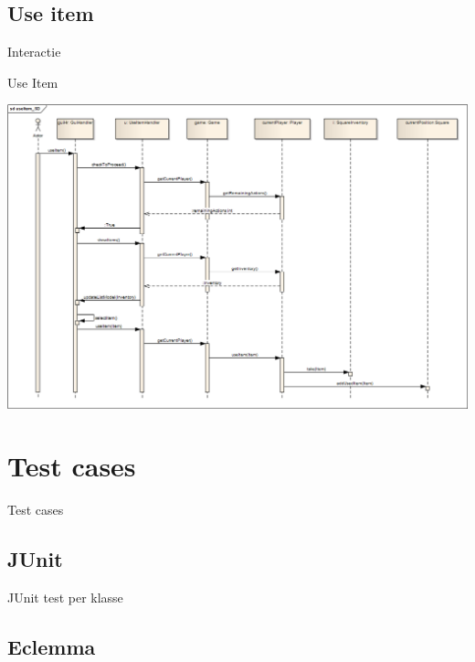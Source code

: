 \documentclass[t]{beamer}
\begin{document}
\subsection{Use item}
\begin{frame}{Interactie}
\begin{multicols}{2}
\tableofcontents[currentsection]
\end{multicols}
\end{frame}

\begin{frame}[plain]{Use Item}
\begin{center}
\includegraphics[width= 1\linewidth]{../uml/useItem_SD.png}
\end{center}
\end{frame}

\section{Test cases}
\begin{frame}{Test cases}
\begin{multicols}{2}
\tableofcontents[currentsection]
\end{multicols}
\end{frame}

\subsection{JUnit}
\begin{frame}{JUnit test per klasse}

\end{frame}

\subsection{Eclemma}
\begin{frame}

\end{frame}
\end{document}
